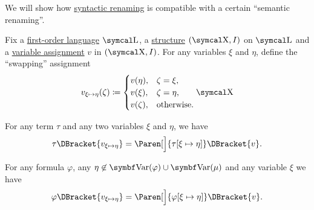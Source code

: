 \begin{proposition}\label{thm:swapping_assignment_compatibility}
  We will show how \hyperref[rem:first_order_substitution_renaming_justification]{syntactic renaming} is compatible with a certain \enquote{semantic renaming}.

  Fix a \hyperref[def:first_order_syntax]{first-order language} \( \CL \), a \hyperref[def:first_order_structure]{structure} \( (\CX, I) \) on \( \CL \) and a \hyperref[def:first_order_valuation/variable_assignment]{variable assignment} \( v \) in \( (\CX, I) \). For any variables \( \xi \) and \( \eta \), define the \enquote{swapping} assignment
  \begin{equation}\label{eq:thm:swapping_assignment_compatibility/swapping_assignment}
    v_{\xi \mapsto \eta}(\zeta) \coloneqq \begin{cases}
      v(\eta),  &\zeta = \xi, \\
      v(\xi),   &\zeta = \eta, \\
      v(\zeta), &\text{otherwise}.
    \end{cases}\CX
  \end{equation}

  \begin{PropEnum}
     For any term \( \tau \) and any two variables \( \xi \) and \( \eta \), we have
    \begin{equation}\label{eq:thm:swapping_assignment_compatibility/terms}
      \tau\DBracket{v_{\xi \mapsto \eta}}
      =
      \Paren[\Big]{ \tau[\xi \mapsto \eta] }\DBracket{v}.
    \end{equation}

     For any formula \( \varphi \), any \( \eta \not\in \Bold{Var}(\varphi) \cup \Bold{Var}(\mu) \) and any variable \( \xi \) we have
    \begin{equation}\label{eq:thm:swapping_assignment_compatibility/formulas}
      \varphi\DBracket{v_{\xi \mapsto \eta}}
      =
      \Paren[\Big]{ \varphi[\xi \mapsto \eta] }\DBracket{v}.
    \end{equation}
  \end{PropEnum}
\end{proposition}
